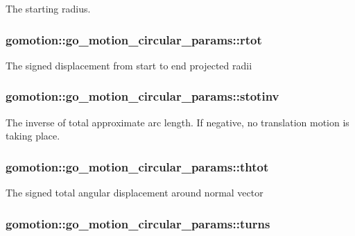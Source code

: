 The starting radius. \hypertarget{structgomotion_1_1go__motion__circular__params_a576992f878d73c0771e072fe37438f4f}{
\subsubsection[{rtot}]{ gomotion\-::go\-\_\-motion\-\_\-circular\-\_\-params\-::rtot}}\label{structgomotion_1_1go__motion__circular__params_a576992f878d73c0771e072fe37438f4f}
The signed displacement from start to end projected radii \hypertarget{structgomotion_1_1go__motion__circular__params_a4436b498d123ce3776166eb75e8efcd5}{
\subsubsection[{stotinv}]{ gomotion\-::go\-\_\-motion\-\_\-circular\-\_\-params\-::stotinv}}\label{structgomotion_1_1go__motion__circular__params_a4436b498d123ce3776166eb75e8efcd5}
The inverse of total approximate arc length. If negative, no translation motion is taking place. \hypertarget{structgomotion_1_1go__motion__circular__params_a03f65f0ef19c2d9e83d05de75fe9fd3f}{
\subsubsection[{thtot}]{ gomotion\-::go\-\_\-motion\-\_\-circular\-\_\-params\-::thtot}}\label{structgomotion_1_1go__motion__circular__params_a03f65f0ef19c2d9e83d05de75fe9fd3f}
The signed total angular displacement around normal vector \hypertarget{structgomotion_1_1go__motion__circular__params_a2d8430003302e61cb95c2a0c75e60037}{
\subsubsection[{turns}]{ gomotion\-::go\-\_\-motion\-\_\-circular\-\_\-params\-::turns}}\label{structgomotion_1_1go__motion__circular__params_a2d8430003302e61cb95c2a0c75e60037}
